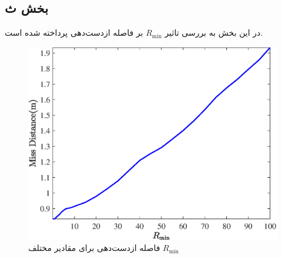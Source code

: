 \subsection{بخش ث}
در این بخش به بررسی تاثیر $R_{\min}$ بر فاصله‌ ازدست‌دهی پرداخته شده است.

\begin{figure}[H]
	\centering
	\includegraphics[width=.75\linewidth]{../Figure/Q1/e/MD}
	\caption{فاصله ازدست‌دهی برای مقادیر مختلف
	$R_{\min}$}
\end{figure}